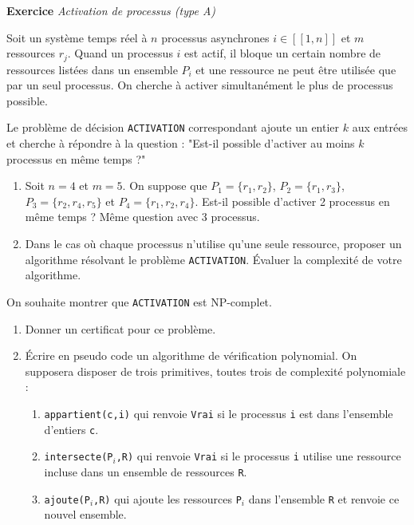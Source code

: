 \documentclass[a4paper, 11pt]{article}
\newcounter{exocntr}
\newcommand{\exocommand}[1]{\stepcounter{exocntr} \textbf{Exercice \arabic{exocntr}} \textit{#1}}
\begin{document}
\newpage

\exocommand{Activation de processus (type A)}

  Soit un système temps réel à $n$ processus asynchrones $i\in[\![1,n]\!]$ et $m$ ressources $r_j$. Quand un processus $i$ est actif, il bloque un certain nombre de ressources listées dans un ensemble $P_i$ et une ressource ne peut être utilisée que par un seul processus. On cherche à activer simultanément le plus de processus possible.

  \smallskip

  Le problème de décision \texttt{ACTIVATION} correspondant ajoute un entier $k$ aux entrées et cherche à répondre à la question : "Est-il possible d'activer au moins $k$ processus en même temps ?"

  \begin{enumerate}
  \item Soit $n=4$ et $m=5$. On suppose que $P_1=\{r_1,r_2\}$, $P_2=\{r_1,r_3\}$, $P_3=\{r_2,r_4,r_5\}$ et $P_4=\{r_1,r_2,r_4\}$. Est-il possible d'activer 2 processus en même temps ? Même question avec 3 processus.
  \item Dans le cas où chaque processus n'utilise qu'une seule ressource, proposer un algorithme  résolvant le problème \texttt{ACTIVATION}. \'Evaluer la complexité de votre algorithme.
  \end{enumerate}

  On souhaite montrer que \texttt{ACTIVATION} est NP-complet.

  \begin{enumerate}[resume]
  \item Donner un certificat pour ce problème.
  \item{\'Ecrire en pseudo code un algorithme de vérification polynomial. On supposera disposer de trois primitives, toutes trois de complexité polynomiale :
  \begin{enumerate}
      \item \texttt{appartient(c,i)} qui renvoie \texttt{Vrai} si le processus \texttt{i} est dans l'ensemble d'entiers \texttt{c}.
      \item \texttt{intersecte(P$_i$,R)} qui renvoie \texttt{Vrai} si le processus \texttt{i} utilise une ressource incluse dans un ensemble de ressources \texttt{R}.
      \item \texttt{ajoute(P$_i$,R)} qui ajoute les ressources \texttt{P$_i$} dans l'ensemble \texttt{R} et renvoie ce nouvel ensemble.
  \end{enumerate}}
\end{enumerate}
\end{document}
